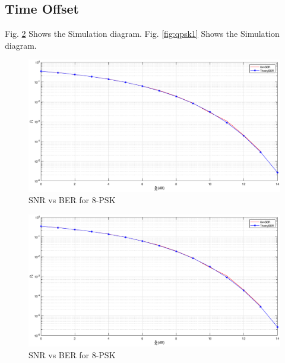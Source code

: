 \documentclass[journal,12pt,twocolumn]{IEEEtran}
\begin{document}
\subsection{Time Offset}
Fig. \ref{fig:8psk1} Shows the Simulation diagram.  Fig. \ref{fig:qpsk1} Shows the Simulation diagram.
%
\begin{figure}[!ht]
\begin{center}
\includegraphics[width=\columnwidth]{./figs/8PSK1}
\end{center}
\caption{SNR vs BER for 8-PSK}
\label{fig:8psk1}
\end{figure}
\begin{figure}[!ht]
\begin{center}
\includegraphics[width=\columnwidth]{./figs/8PSK1}
\end{center}
\caption{SNR vs BER for 8-PSK}
\label{fig:8psk1}
\end{figure}
\end{document}
